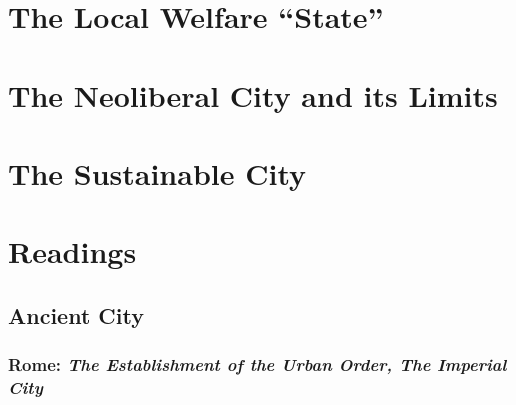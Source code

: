 \documentclass{article}
\begin{document}
\subsection{}

\section{The Local Welfare ``State''}

\subsection{}

\section{The Neoliberal City and its Limits}

\subsection{}

\section{The Sustainable City}

\subsection{}


\section{Readings}

\subsection{Ancient City}

\subsubsection{Rome: \textit{The Establishment of the Urban Order, The Imperial City} \parencite{hall1998cities}}
\end{document}
